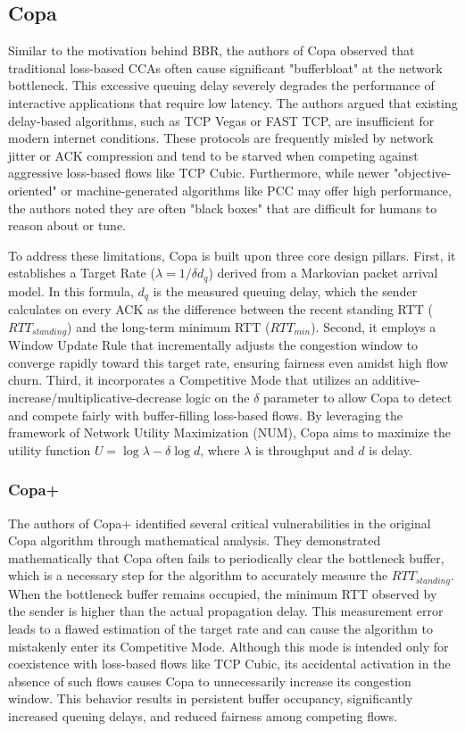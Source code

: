 \documentclass[conference]{IEEEtran}
\begin{document}
\subsection{Copa}

Similar to the motivation behind BBR, the authors of Copa observed that traditional loss-based \acs{CCA}s often cause significant "bufferbloat" at the network bottleneck\cite{COPA}. 
This excessive queuing delay severely degrades the performance of interactive applications that require low latency. 
The authors argued that existing delay-based algorithms, such as TCP Vegas or FAST TCP, are insufficient for modern internet conditions.
These protocols are frequently misled by network jitter or ACK compression and tend to be starved when competing against aggressive loss-based flows like TCP Cubic. 
Furthermore, while newer "objective-oriented" or machine-generated algorithms like PCC may offer high performance, the authors noted they are often "black boxes" that are difficult for humans to reason about or tune.

To address these limitations, Copa is built upon three core design pillars. 
First, it establishes a Target Rate ($\lambda = 1/\delta d_q$) derived from a Markovian packet arrival model. 
In this formula, $d_q$ is the measured queuing delay, which the sender calculates on every ACK as the difference between the recent standing RTT ($RTT_{standing}$) and the long-term minimum RTT ($RTT_{min}$). 
Second, it employs a Window Update Rule that incrementally adjusts the congestion window to converge rapidly toward this target rate, ensuring fairness even amidst high flow churn. 
Third, it incorporates a Competitive Mode that utilizes an additive-increase/multiplicative-decrease logic on the $\delta$ parameter to allow Copa to detect and compete fairly with buffer-filling loss-based flows. 
By leveraging the framework of Network Utility Maximization (NUM), Copa aims to maximize the utility function $U = \log \lambda - \delta \log d$, where $\lambda$ is throughput and $d$ is delay.

\subsubsection{Copa+}

The authors of Copa+ identified several critical vulnerabilities in the original Copa algorithm through mathematical analysis\cite{COPAPLUS}. 
They demonstrated mathematically that Copa often fails to periodically clear the bottleneck buffer, which is a necessary step for the algorithm to accurately measure the $RTT_{standing}$. 
When the bottleneck buffer remains occupied, the minimum RTT observed by the sender is higher than the actual propagation delay. 
This measurement error leads to a flawed estimation of the target rate and can cause the algorithm to mistakenly enter its Competitive Mode. 
Although this mode is intended only for coexistence with loss-based flows like TCP Cubic, its accidental activation in the absence of such flows causes Copa to unnecessarily increase its congestion window. 
This behavior results in persistent buffer occupancy, significantly increased queuing delays, and reduced fairness among competing flows.
\end{document}
